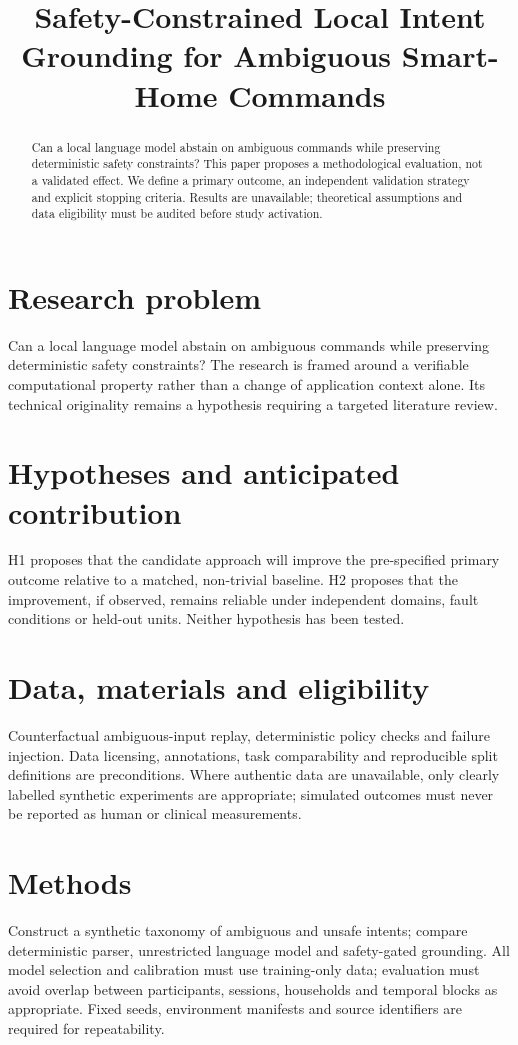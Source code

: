 \documentclass[11pt,a4paper]{article}
\title{Safety-Constrained Local Intent Grounding for Ambiguous Smart-Home Commands}
\author{}
\date{}
\begin{document}
\maketitle
\begin{abstract}
Can a local language model abstain on ambiguous commands while preserving deterministic safety constraints? This paper proposes a methodological evaluation, not a validated effect. We define a primary outcome, an independent validation strategy and explicit stopping criteria. Results are unavailable; theoretical assumptions and data eligibility must be audited before study activation.
\end{abstract}
\section{Research problem}
Can a local language model abstain on ambiguous commands while preserving deterministic safety constraints? The research is framed around a verifiable computational property rather than a change of application context alone. Its technical originality remains a hypothesis requiring a targeted literature review.
\section{Hypotheses and anticipated contribution}
H1 proposes that the candidate approach will improve the pre-specified primary outcome relative to a matched, non-trivial baseline. H2 proposes that the improvement, if observed, remains reliable under independent domains, fault conditions or held-out units. Neither hypothesis has been tested.
\section{Data, materials and eligibility}
Counterfactual ambiguous-input replay, deterministic policy checks and failure injection. Data licensing, annotations, task comparability and reproducible split definitions are preconditions. Where authentic data are unavailable, only clearly labelled synthetic experiments are appropriate; simulated outcomes must never be reported as human or clinical measurements.
\section{Methods}
Construct a synthetic taxonomy of ambiguous and unsafe intents; compare deterministic parser, unrestricted language model and safety-gated grounding. All model selection and calibration must use training-only data; evaluation must avoid overlap between participants, sessions, households and temporal blocks as appropriate. Fixed seeds, environment manifests and source identifiers are required for repeatability.
\end{document}
